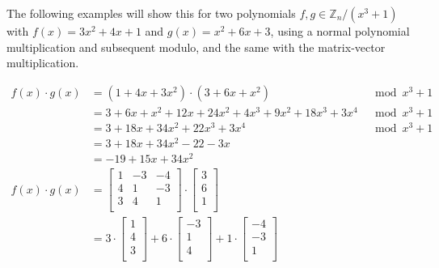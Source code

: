 The following examples will show this for two polynomials $f, g \in \mathbb{Z}_n/(x^3+1)$ with $f(x) = 3x^2+4x+1$ and $g(x) = x^2+6x+3$, using a normal polynomial multiplication and subsequent modulo, and the same with the matrix-vector multiplication.

\begin{align*}
  f(x)\cdot g(x) & = (1+4x+3x^2) \cdot (3+6x+x^2)                & \mod x^3+1 \\
                 & = 3+6x+x^2 + 12x+24x^2+4x^3 + 9x^2+18x^3+3x^4 & \mod x^3+1 \\
                 & = 3+18x+34x^2+22x^3+3x^4                      & \mod x^3+1 \\
                 & = 3+18x+34x^2-22-3x                           &            \\
                 & = -19+15x+34x^2                               &            \\
  f(x)\cdot g(x) & = {
  \begin{bmatrix}
    1 & -3 & -4 \\
    4 & 1  & -3 \\
    3 & 4  & 1  \\
  \end{bmatrix}
  \cdot 
  \begin{bmatrix}
    3 \\
    6 \\
    1 \\
  \end{bmatrix} }                                                             \\
                 & = {
  3 \cdot \begin{bmatrix}
            1 \\
            4 \\
            3 \\
          \end{bmatrix}
  + 6 \cdot   \begin{bmatrix}
                -3 \\
                1  \\
                4  \\
              \end{bmatrix}
  + 1 \cdot   \begin{bmatrix}
                -4 \\
                -3 \\
                1  \\
              \end{bmatrix}
}
\end{align*}
